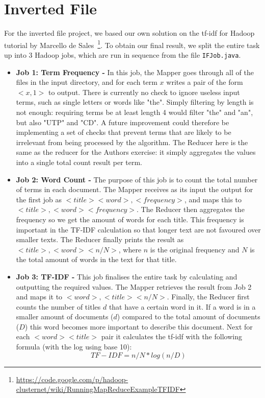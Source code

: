 \documentclass[11pt]{article}
\begin{document}
\section{Inverted File}
For the inverted file project, we based our own solution on the tf-idf for Hadoop tutorial by Marcello de Sales~\footnote{\url{https://code.google.com/p/hadoop-clusternet/wiki/RunningMapReduceExampleTFIDF}}. To obtain our final result, we split the entire task up into 3 Hadoop jobs, which are run in sequence from the file \lstinline{IFJob.java}.

\begin{itemize}

\item \textbf{Job 1: Term Frequency -} In this job, the Mapper goes through all of the files in the input directory, and for each term $x$ writes a pair of the form $<x, 1>$ to output. There is currently no check to ignore useless input terms, such as single letters or words like "the". Simply filtering by length is not enough: requiring terms be at least length 4 would filter "the" and "an", but also "UTP" and "CD". A future improvement could therefore be implementing a set of checks that prevent terms that are likely to be irrelevant from being processed by the algorithm.
The Reducer here is the same as the reducer for the Authors exercise: it simply aggregates the values into a single total count result per term.
\item \textbf{Job 2: Word Count -} The purpose of this job is to count the total number of terms in each document. The Mapper receives as its input the output for the first job as $<title><word>,<frequency>$, and maps this to $<title>, <word><frequency>$. The Reducer then aggregates the frequency so we get the amount of words for each title. This frequency is important in the TF-IDF calculation so that longer text are not favoured over smaller texts. The Reducer finally prints the result as $<title>, <word><n/N>$, where $n$ is the original frequency and $N$ is the total amount of words in the text for that title.
\item \textbf{Job 3: TF-IDF -} This job finalises the entire task by calculating and outputting the required values. The Mapper retrieves the result from Job 2 and maps it to $<word>, <title><n/N>$. Finally, the Reducer first counts the number of titles $d$ that have a certain word in it. If a word is in a smaller amount of documents ($d$) compared to the total amount of documents ($D$) this word becomes more important to describe this document. Next for each $<word><title>$ pair it calculates the tf-idf with the following formula (with the log using base 10): $$TF-IDF = n/N * log(n/D)$$
\end{itemize}
\end{document}
